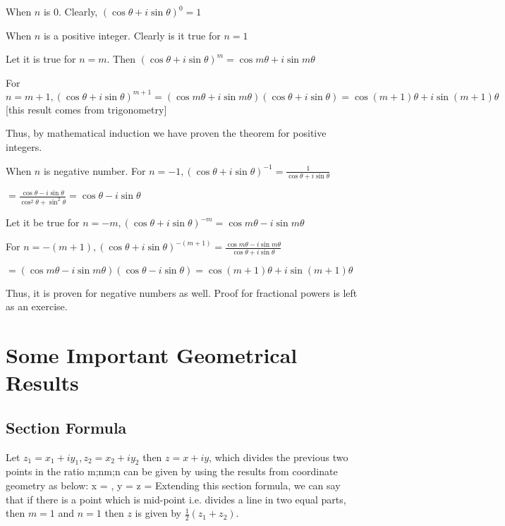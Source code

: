 When $n$ is $0$. Clearly, $(\cos\theta + i\sin\theta)^0 = 1$

 When $n$ is a positive integer. Clearly is it true for $n = 1$

\noindent Let it is true for $n = m$. Then $(\cos\theta + i\sin\theta)^m = \cos m\theta + i\sin m\theta$

\noindent For $n = m + 1, (\cos\theta + i\sin\theta)^{m + 1} = (\cos m\theta + i\sin m\theta)(\cos\theta + i\sin\theta) = \cos(m + 1)\theta +
i\sin(m + 1)\theta$ [this result comes from trigonometry]

\noindent Thus, by mathematical induction we have proven the theorem for positive integers.

 When $n$ is negative number. For $n = -1, (\cos\theta + i\sin\theta)^{-1} = \frac{1}{\cos\theta +
  i\sin\theta}$

\noindent $= \frac{\cos\theta - i\sin\theta}{\cos^2\theta + \sin^2\theta} = \cos\theta - i\sin\theta$

\noindent Let it be true for $n = -m, (\cos\theta + i\sin\theta)^{-m} = \cos m\theta - i\sin m\theta$

\noindent For $n = -(m + 1), (\cos\theta + i\sin\theta)^{-(m + 1)} = \frac{\cos m\theta - i\sin m\theta}{\cos\theta + i\sin\theta}$

\noindent $= (\cos m\theta - i\sin m\theta)(\cos\theta - i\sin\theta) = \cos(m + 1)\theta + i\sin(m + 1)\theta$

Thus, it is proven for negative numbers as well. Proof for fractional powers is left as an exercise.

\section{Some Important Geometrical Results}
\subsection{Section Formula}
Let $z_1 = x_1 + iy_1, z_2 = x_2 + iy_2$ then $z = x + iy$, which divides the previous two points in the ratio m;nm;n can be given
by using the results from coordinate geometry as below:
\startformula x = , y =  z = \stopformula
Extending this section formula, we can say that if there is a point which is mid-point i.e. divides a line in two equal parts, then
$m = 1$ and $n = 1$ then $z$ is given by $\frac{1}{2}(z_1 + z_2)$.
